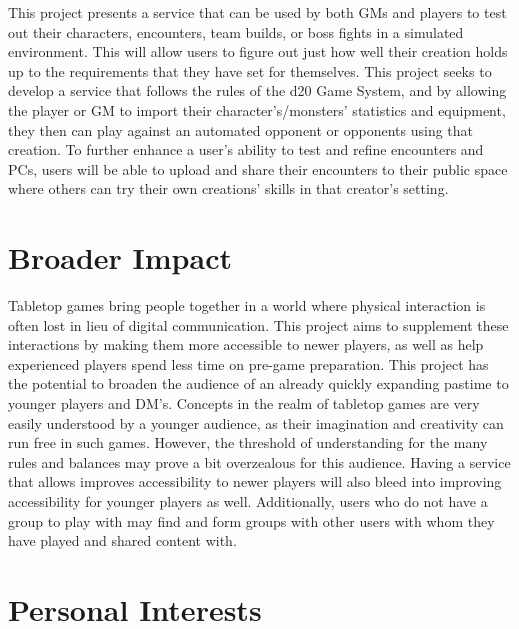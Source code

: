 \documentclass[12pt,a4paper]{report}
\begin{document}
This project presents a service that can be used by both GMs and players to test out their characters, encounters, team builds, or boss fights in a simulated environment. This will allow users to figure out just how well their creation holds up to the requirements that they have set for themselves. This project seeks to develop a service that follows the rules of the d20 Game System, and by allowing the player or GM to import their character's/monsters' statistics and equipment, they then can play against an automated opponent or opponents using that creation. To further enhance a user's ability to test and refine encounters and PCs, users will be able to upload and share their encounters to their public space where others can try their own creations' skills in that creator's setting.

\newpage
\chapter*{Broader Impact}

Tabletop games bring people together in a world where physical interaction is often lost in lieu of digital communication. This project aims to supplement these interactions by making them more accessible to newer players, as well as help experienced players spend less time on pre-game preparation. 
This project has the potential to broaden the audience of an already quickly expanding pastime to younger players and DM's. Concepts in the realm of tabletop games are very easily understood by a younger audience, as their imagination and creativity can run free in such games. However, the threshold of understanding for the many rules and balances may prove a bit overzealous for this audience. Having a service that allows improves accessibility to newer players will also bleed into improving accessibility for younger players as well. Additionally, users who do not have a group to play with may find and form groups with other users with whom they have played and shared content with.
	
\newpage
\chapter*{Personal Interests}
\end{document}
